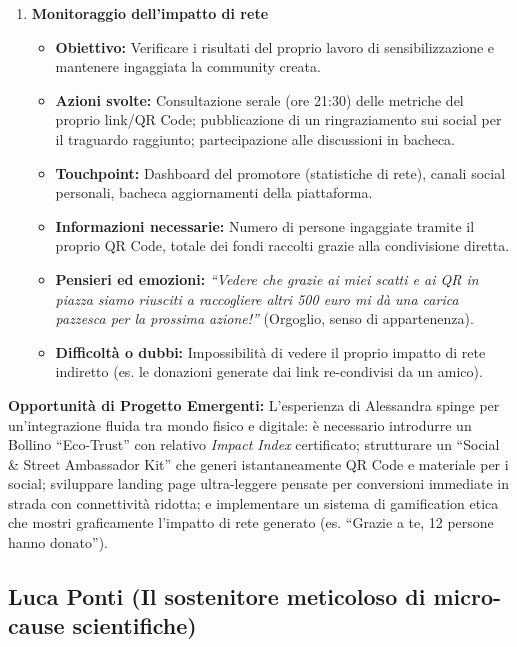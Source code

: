 \documentclass[11pt,a4paper]{article}
\begin{document}
\begin{enumerate}
        \item \textbf{Monitoraggio dell'impatto di rete}
        \begin{itemize}
            \item \textbf{Obiettivo:} Verificare i risultati del proprio lavoro di sensibilizzazione e mantenere ingaggiata la community creata.
            \item \textbf{Azioni svolte:} Consultazione serale (ore 21:30) delle metriche del proprio link/QR Code; pubblicazione di un ringraziamento sui social per il traguardo raggiunto; partecipazione alle discussioni in bacheca.
            \item \textbf{Touchpoint:} Dashboard del promotore (statistiche di rete), canali social personali, bacheca aggiornamenti della piattaforma.
            \item \textbf{Informazioni necessarie:} Numero di persone ingaggiate tramite il proprio QR Code, totale dei fondi raccolti grazie alla condivisione diretta.
            \item \textbf{Pensieri ed emozioni:} \textit{``Vedere che grazie ai miei scatti e ai QR in piazza siamo riusciti a raccogliere altri 500 euro mi dà una carica pazzesca per la prossima azione!''} (Orgoglio, senso di appartenenza).
            \item \textbf{Difficoltà o dubbi:} Impossibilità di vedere il proprio impatto di rete indiretto (es. le donazioni generate dai link re-condivisi da un amico).
        \end{itemize}

    \end{enumerate}

    \vspace{0.3cm}
    \noindent\textbf{Opportunità di Progetto Emergenti:} L'esperienza di Alessandra spinge per un'integrazione fluida tra mondo fisico e digitale: è necessario introdurre un Bollino ``Eco-Trust'' con relativo \textit{Impact Index} certificato; strutturare un ``Social \& Street Ambassador Kit'' che generi istantaneamente QR Code e materiale per i social; sviluppare landing page ultra-leggere pensate per conversioni immediate in strada con connettività ridotta; e implementare un sistema di gamification etica che mostri graficamente l'impatto di rete generato (es. ``Grazie a te, 12 persone hanno donato'').


    \subsection{Luca Ponti (Il sostenitore meticoloso di micro-cause scientifiche)}
    \label{subsec:uj4}
\end{document}
